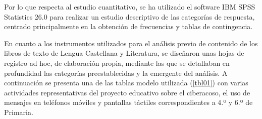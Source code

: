 \documentclass{textolivre}
\begin{document}
Por lo que respecta al estudio cuantitativo, se ha utilizado el software IBM SPSS Statistics 26.0 para realizar un estudio descriptivo de las categorías de respuesta, centrado principalmente en la obtención de frecuencias y tablas de contingencia.  

En cuanto a los instrumentos utilizados para el análisis previo de contenido de los libros de texto de Lengua Castellana y Literatura, se diseñaron unas hojas de registro ad hoc, de elaboración propia, mediante las que se detallaban en profundidad las categorías preestablecidas y la emergente del análisis. A continuación se presenta una de las tablas modelo utilizada (\cref{tbl01}) con varias actividades representativas del proyecto educativo sobre el ciberacoso, el uso de mensajes en teléfonos móviles y pantallas táctiles correspondientes a 4.º y 6.º de Primaria.  
\end{document}
